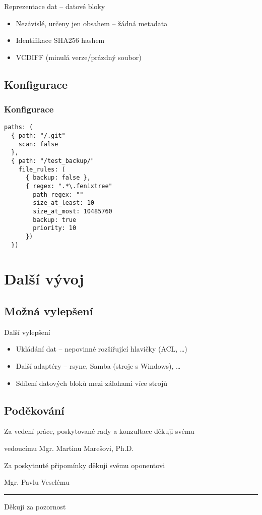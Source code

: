 \documentclass{beamer}				%
\begin{document}
\begin{frame}{Reprezentace dat -- datové bloky}
\begin{itemize}
	\item Nezávislé, určeny jen obsahem -- žádná metadata
	\pause\item Identifikace SHA256 hashem
	\pause\item VCDIFF (minulá verze/prázdný soubor)
\end{itemize}
\end{frame}

\subsection{Konfigurace}

\begin{frame}[fragile]
\frametitle{Konfigurace}
\begin{verbatim}
paths: (
  { path: "/.git"
    scan: false
  },
  { path: "/test_backup/"
    file_rules: (
      { backup: false },
      { regex: ".*\.fenixtree"
        path_regex: ""
        size_at_least: 10
        size_at_most: 10485760
        backup: true
        priority: 10
      })
  })
\end{verbatim}
\end{frame}

\section{Další vývoj}
\subsection{Možná vylepšení}

\begin{frame}{Další vylepšení}
\begin{itemize}
	\item Ukládání dat -- nepovinné rozšiřující hlavičky (ACL, \dots)
	\pause\item Další adaptéry -- rsync, Samba (stroje s Windows), \dots
	\pause\item Sdílení datových bloků mezi zálohami více strojů
\end{itemize}

\end{frame}

\subsection{Poděkování}
\begin{frame}{}

\centerline{Za vedení práce, poskytované rady a konzultace děkuji svému}
\centerline{vedoucímu Mgr. Martinu Marešovi, Ph.D.}

\bigskip\bigskip

\centerline{Za poskytnuté připomínky děkuji svému oponentovi}
\centerline{Mgr. Pavlu Veselému}

\pause
\bigskip\hrule
\vfill
{\Large\centerline{Děkuji za pozornost}}
\vfill
\end{frame}
\end{document}
